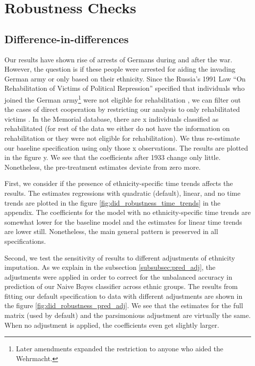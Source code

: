 

\section{Robustness Checks} \label{subsec:robust_checks}
\subsection{Difference-in-differences}

Our results have shown rise of arrests of Germans during and after the war. 
However, the question is if these people were arrested for aiding the invading German army or only based on their ethnicity. 
Since the  Russia’s 1991 Law  \enquote{On Rehabilitation of Victims of Political Repression} specified  that individuals who joined the German army\footnote{Later amendments expanded the restriction to anyone who aided the Wehrmacht. }  were not eligible for rehabilitation , we can filter out the cases of direct 
cooperation by restricting  our analysis to only rehabilitated victims \citep{frierson_russias_2014}. 
In the Memorial database, there  are x individuals  classified as  rehabilitated (for rest of the data we either do not have the information on rehabilitation or they were not eligible for rehabilitation).  We thus re-estimate our baseline specification using only those x observations. The results are plotted in the figure y. We see that the coefficients after 1933 change only little. Nonetheless, the pre-treatment estimates deviate from zero more. 

First, we consider if the presence of ethnicity-specific time trends affects the results.
The estimates regressions with quadratic (default), linear, and no time trends are  plotted in the figure \ref{fig:did_robustness_time_trends} in the appendix. The coefficients for the model with no ethnicity-specific time trends are somewhat lower for the baseline model and the estimates for linear time trends are lower still. Nonetheless, the main general pattern is preserved in all specifications.

Second, we test the sensitivity of results to different adjustments of ethnicity imputation. 
As we explain in the subsection \ref{subsubsec:pred_adj}, the adjustments were applied in order to correct for the unbalanced accuracy in prediction of our Naive Bayes classifier across ethnic groups. The results from fitting our default specification to data with different adjustments are shown in the figure \ref{fig:did_robustness_pred_adj}.
We see that the estimates for the full matrix (used by default) and the parsimonious adjustment are virtually the same. When no adjustment is applied, the coefficients even get slightly larger. 
